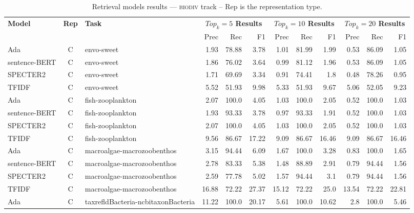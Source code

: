 
    \begin{table}[h]
         \centering
         \caption{Retrieval models results --- \textsc{biodiv} track -- Rep is the representation type.} \label{tab:ir_biodiv}
         \begin{tabular}{|l|c|l|r|r|r|r|r|r|r|r|r|}
             \hline
             \multirow{2}{*}{\textbf{Model}}  & \multirow{2}{*}{\textbf{Rep}}  & \multirow{2}{*}{\textbf{Task}} &  \multicolumn{3}{c|}{\textbf{$Top_k=5$ Results}} &  \multicolumn{3}{c|}{\textbf{$Top_k=10$ Results}} &  \multicolumn{3}{c|}{\textbf{$Top_k=20$ Results}}\\
             \cline{4-12}
              & & & Prec & Rec & F1& Prec & Rec & F1& Prec & Rec & F1 \\
             \hline
    	Ada  & C & envo-sweet  & 1.93 & 78.88 & 3.78 & 1.01 & 81.99 & 1.99 & 0.53 & 86.09 & 1.05\\
	sentence-BERT  & C & envo-sweet  & 1.86 & 76.02 & 3.64 & 0.99 & 81.12 & 1.96 & 0.53 & 86.09 & 1.05\\
	SPECTER2  & C & envo-sweet  & 1.71 & 69.69 & 3.34 & 0.91 & 74.41 & 1.8 & 0.48 & 78.26 & 0.95\\
	TFIDF  & C & envo-sweet  & 5.52 & 51.93 & 9.98 & 5.33 & 51.93 & 9.67 & 5.06 & 52.05 & 9.23\\
	\hline
	Ada  & C & fish-zooplankton  & 2.07 & 100.0 & 4.05 & 1.03 & 100.0 & 2.05 & 0.52 & 100.0 & 1.03\\
	sentence-BERT  & C & fish-zooplankton  & 1.93 & 93.33 & 3.78 & 0.97 & 93.33 & 1.91 & 0.52 & 100.0 & 1.03\\
	SPECTER2  & C & fish-zooplankton  & 2.07 & 100.0 & 4.05 & 1.03 & 100.0 & 2.05 & 0.52 & 100.0 & 1.03\\
	TFIDF  & C & fish-zooplankton  & 9.56 & 86.67 & 17.22 & 9.09 & 86.67 & 16.46 & 9.09 & 86.67 & 16.46\\
	\hline
	Ada  & C & macroalgae-macrozoobenthos  & 3.15 & 94.44 & 6.09 & 1.67 & 100.0 & 3.28 & 0.83 & 100.0 & 1.65\\
	sentence-BERT  & C & macroalgae-macrozoobenthos  & 2.78 & 83.33 & 5.38 & 1.48 & 88.89 & 2.91 & 0.79 & 94.44 & 1.56\\
	SPECTER2  & C & macroalgae-macrozoobenthos  & 2.59 & 77.78 & 5.02 & 1.57 & 94.44 & 3.1 & 0.79 & 94.44 & 1.56\\
	TFIDF  & C & macroalgae-macrozoobenthos  & 16.88 & 72.22 & 27.37 & 15.12 & 72.22 & 25.0 & 13.54 & 72.22 & 22.81\\
	\hline
	Ada  & C & taxrefldBacteria-ncbitaxonBacteria  & 11.22 & 100.0 & 20.17 & 5.61 & 100.0 & 10.62 & 2.8 & 100.0 & 5.46\\

\end{tabular}
\end{table}
